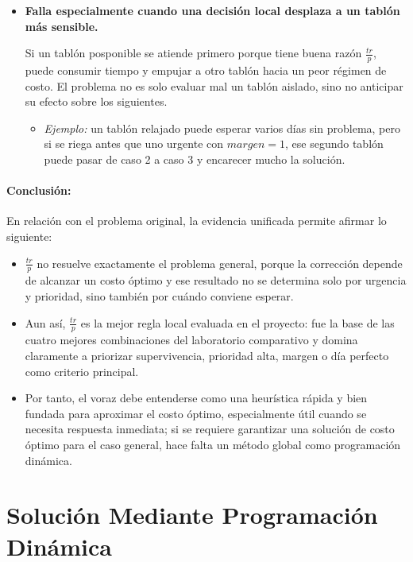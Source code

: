 \documentclass[12pt,a4paper]{article}
\begin{document}
\begin{itemize}
  \item \textbf{Falla especialmente cuando una decisi\'on local desplaza a un tabl\'on m\'as sensible.}

  Si un tabl\'on posponible se atiende primero porque tiene buena raz\'on \(\frac{tr}{p}\), puede consumir tiempo y empujar a otro tabl\'on hacia un peor r\'egimen de costo. El problema no es solo evaluar mal un tabl\'on aislado, sino no anticipar su efecto sobre los siguientes.

  \begin{itemize}
    \setlength{\itemsep}{0.2em}
    \item \textit{Ejemplo:} un tabl\'on relajado puede esperar varios d\'ias sin problema, pero si se riega antes que uno urgente con \(margen=1\), ese segundo tabl\'on puede pasar de caso 2 a caso 3 y encarecer mucho la soluci\'on.
  \end{itemize}
\end{itemize}

\paragraph{Conclusi\'on:}
En relaci\'on con el problema original, la evidencia unificada permite afirmar lo siguiente:

\begin{itemize}
  \item \(\frac{tr}{p}\) no resuelve exactamente el problema general, porque la correcci\'on depende de alcanzar un costo \'optimo y ese resultado no se determina solo por urgencia y prioridad, sino tambi\'en por cu\'ando conviene esperar.
  \item Aun as\'i, \(\frac{tr}{p}\) es la mejor regla local evaluada en el proyecto: fue la base de las cuatro mejores combinaciones del laboratorio comparativo y domina claramente a priorizar supervivencia, prioridad alta, margen o d\'ia perfecto como criterio principal.
  \item Por tanto, el voraz debe entenderse como una heur\'istica r\'apida y bien fundada para aproximar el costo \'optimo, especialmente \'util cuando se necesita respuesta inmediata; si se requiere garantizar una soluci\'on de costo \'optimo para el caso general, hace falta un m\'etodo global como programaci\'on din\'amica.
\end{itemize}

\section{Soluci\'on Mediante Programaci\'on Din\'amica}
\end{document}
